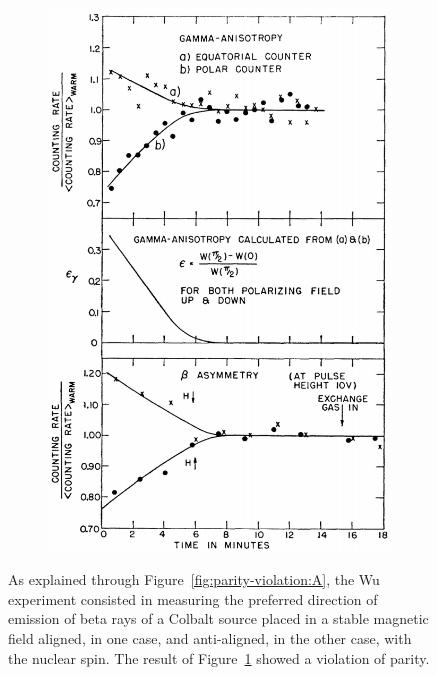 \begin{figure}[H]
\begin{subfigure}{0.4\linewidth}
			\includegraphics[width=0.5\plotwidth]{fig/chapt2/Wu_result.png}
			\caption{\label{fig:parity-violation:B}}
		\end{subfigure}
		\caption{\label{fig:parity-violation} As explained through Figure~\ref{fig:parity-violation:A}, the Wu experiment consisted in measuring the preferred direction of emission of beta rays of a Colbalt source placed in a stable magnetic field aligned, in one case, and anti-aligned, in the other case, with the nuclear spin. The result of Figure~\ref{fig:parity-violation:B} showed a violation of parity.}
	\end{figure}
	
